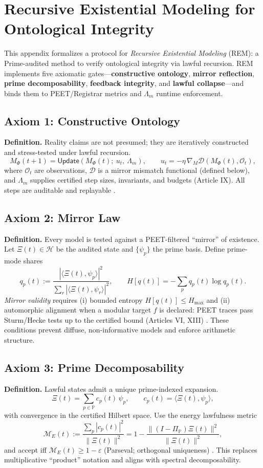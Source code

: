 \documentclass[12pt]{amsart}
\theoremstyle{plain}
\begin{document}
\section{Recursive Existential Modeling for Ontological Integrity}

\noindent This appendix formalizes a protocol for \emph{Recursive Existential Modeling} (REM): a Prime-audited method to verify ontological integrity via lawful recursion. REM implements five axiomatic gates—\textbf{constructive ontology}, \textbf{mirror reflection}, \textbf{prime decomposability}, \textbf{feedback integrity}, and \textbf{lawful collapse}—and binds them to PEET/Registrar metrics and $\Lambda_m$ runtime enforcement.

\subsection{Axiom 1: Constructive Ontology}
\textbf{Definition.} Reality claims are not presumed; they are iteratively constructed and stress-tested under lawful recursion.
\[
M_\Phi(t+1)=\mathsf{Update}\!\left(M_\Phi(t);\ u_t,\ \Lambda_m\right),\qquad
u_t=-\eta\,\nabla_M \mathcal{D}\!\left(M_\Phi(t),\mathcal{O}_t\right),
\]
where $\mathcal{O}_t$ are observations, $\mathcal{D}$ is a mirror mismatch functional (defined below), and $\Lambda_m$ supplies certified step sizes, invariants, and budgets (Article IX). All steps are auditable and replayable \cite{schneider2000enforceable,clarke1999model,baier2008model}.

\subsection{Axiom 2: Mirror Law}
\textbf{Definition.} Every model is tested against a PEET-filtered “mirror” of existence.
Let $\Xi(t)\in\mathcal{H}$ be the audited state and $\{\psi_p\}$ the prime basis. Define prime-mode shares
\[
q_p(t):=\frac{|\langle \Xi(t),\psi_p\rangle|^2}{\sum_{r}|\langle \Xi(t),\psi_r\rangle|^2},\qquad
H[q(t)]=-\sum_{p}q_p(t)\log q_p(t).
\]
\emph{Mirror validity} requires (i) bounded entropy $H[q(t)]\le H_{\max}$ and (ii) automorphic alignment when a modular target $f$ is declared: PEET traces pass Sturm/Hecke tests up to the certified bound (Articles VI, XIII) \cite{cover2006elements,sturm1987congruence,diamond2005first}. These conditions prevent diffuse, non-informative models and enforce arithmetic structure.

\subsection{Axiom 3: Prime Decomposability}
\textbf{Definition.} Lawful states admit a unique prime-indexed expansion.
\[
\Xi(t)=\sum_{p\in\mathbb{P}} c_p(t)\,\psi_p,\qquad c_p(t)=\langle \Xi(t),\psi_p\rangle,
\]
with convergence in the certified Hilbert space. Use the energy lawfulness metric
\[
\mathcal{M}_E(t):=\frac{\sum_{p}|c_p(t)|^2}{\|\Xi(t)\|^2}=1-\frac{\|(I-\Pi_{\mathbb{P}})\Xi(t)\|^2}{\|\Xi(t)\|^2},
\]
and accept iff $\mathcal{M}_E(t)\ge 1-\varepsilon$ (Parseval; orthogonal uniqueness) \cite{rudin1991functional,conway1990functional,lax2002functional}. This replaces multiplicative “product” notation and aligns with spectral decomposability.
\end{document}
